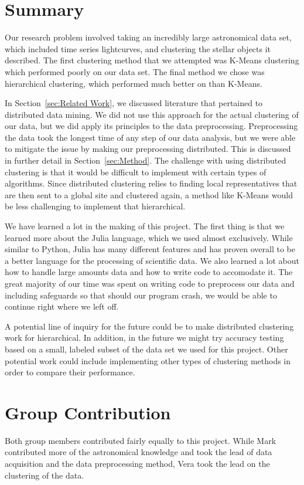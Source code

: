 \documentclass[12pt]{article}
\begin{document}
\section{Summary} %
\label{sec:Summary}
Our research problem involved taking an incredibly large astronomical data set, which included time series lightcurves, and clustering the stellar objects it described.
The first clustering method that we attempted was K-Means clustering which performed poorly on our data set.
The final method we chose was hierarchical clustering, which performed much better on than K-Means.

In Section~\ref{sec:Related Work}, we discussed literature that pertained to distributed data mining.
We did not use this approach for the actual clustering of our data, but we did apply its principles to the data preprocessing.
Preprocessing the data took the longest time of any step of our data analysis, but we were able to mitigate the issue by making our preprocessing distributed.
This is discussed in further detail in Section~\ref{sec:Method}.
The challenge with using distributed clustering is that it would be difficult to implement with certain types of algorithms.
Since distributed clustering relies to finding local representatives that are then sent to a global site and clustered again, a method like K-Means would be less challenging to implement that hierarchical.

We have learned a lot in the making of this project.
The first thing is that we learned more about the Julia language, which we used almost exclusively.
While similar to Python, Julia has many different features and has proven overall to be a better language for the processing of scientific data.
We also learned a lot about how to handle large amounts data and how to write code to accomodate it.
The great majority of our time was spent on writing code to preprocess our data and including safeguards so that should our program crash, we would be able to continue right where we left off.

A potential line of inquiry for the future could be to make distributed clustering work for hierarchical.
In addition, in the future we might try accuracy testing based on a small, labeled subset of the data set we used for this project.
Other potential work could include implementing other types of clustering methods in order to compare their performance.



\newpage
\section{Group Contribution} %
\label{sec:Group Contribution}
Both group members contributed fairly equally to this project.
While Mark contributed more of the astronomical knowledge and took the lead of data acquisition and the data preprocessing method, Vera took the lead on the clustering of the data.

\newpage


\end{document}
